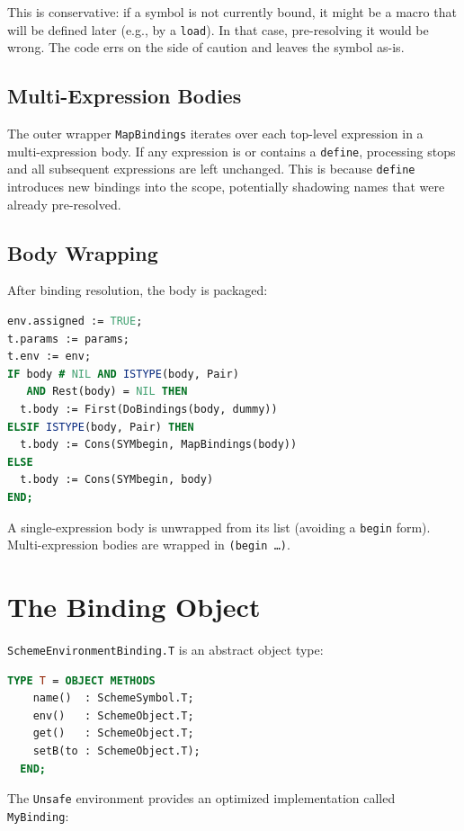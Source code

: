\documentclass[12pt]{report}
\begin{document}
This is conservative: if a symbol is not currently bound, it might be
a macro that will be defined later (e.g., by a \texttt{load}).  In
that case, pre-resolving it would be wrong.  The code errs on the side
of caution and leaves the symbol as-is.

\subsection{Multi-Expression Bodies}

The outer wrapper \texttt{MapBindings} iterates over each top-level
expression in a multi-expression body.  If any expression is or
contains a \texttt{define}, processing stops and all subsequent
expressions are left unchanged.  This is because \texttt{define}
introduces new bindings into the scope, potentially shadowing names
that were already pre-resolved.

\subsection{Body Wrapping}

After binding resolution, the body is packaged:

\begin{lstlisting}[language=Modula3]
env.assigned := TRUE;
t.params := params;
t.env := env;
IF body # NIL AND ISTYPE(body, Pair)
   AND Rest(body) = NIL THEN
  t.body := First(DoBindings(body, dummy))
ELSIF ISTYPE(body, Pair) THEN
  t.body := Cons(SYMbegin, MapBindings(body))
ELSE
  t.body := Cons(SYMbegin, body)
END;
\end{lstlisting}

A single-expression body is unwrapped from its list (avoiding a
\texttt{begin} form).  Multi-expression bodies are wrapped in
\texttt{(begin~\ldots)}.

\section{The Binding Object}
\label{sec:bindingobj}

\texttt{SchemeEnvironmentBinding.T} is an abstract object type:

\begin{lstlisting}[language=Modula3]
TYPE T = OBJECT METHODS
    name()  : SchemeSymbol.T;
    env()   : SchemeObject.T;
    get()   : SchemeObject.T;
    setB(to : SchemeObject.T);
  END;
\end{lstlisting}

The \texttt{Unsafe} environment provides an optimized implementation
called \texttt{MyBinding}:
\end{document}
